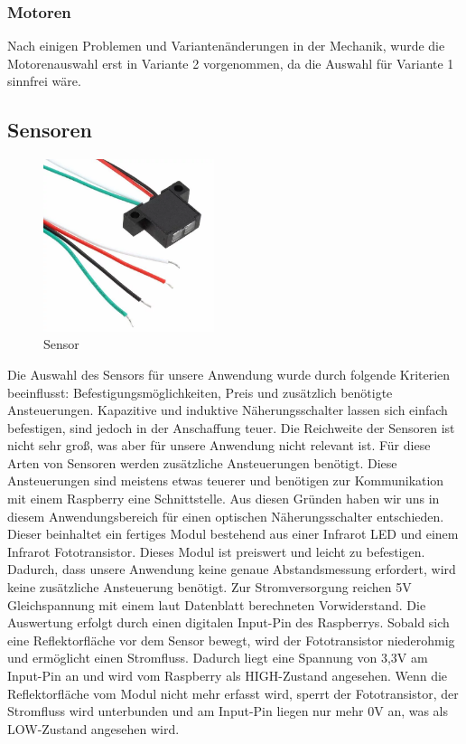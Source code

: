 \subsubsection{Motoren}
Nach einigen Problemen und Variantenänderungen in der Mechanik, wurde die Motorenauswahl erst in Variante 2 vorgenommen, da die Auswahl für Variante 1 sinnfrei wäre.

\subsection{Sensoren}
\begin{figure}[H] 
\begin{center}

\includegraphics[width=5cm]{Bilder/Bauteile/Sensor}
\caption{Sensor}
\label{Sensor}

\end{center}
\end{figure}
Die Auswahl des Sensors für unsere Anwendung wurde durch folgende Kriterien beeinflusst: Befestigungsmöglichkeiten, Preis und zusätzlich benötigte Ansteuerungen.
Kapazitive und induktive Näherungsschalter lassen sich einfach befestigen, sind jedoch in der Anschaffung teuer. Die Reichweite der Sensoren ist nicht sehr groß, was aber für unsere Anwendung nicht relevant ist. Für diese Arten von Sensoren werden zusätzliche Ansteuerungen benötigt. Diese Ansteuerungen sind meistens etwas teuerer und benötigen zur Kommunikation mit einem Raspberry eine Schnittstelle.
Aus diesen Gründen haben wir uns in diesem Anwendungsbereich für einen optischen Näherungsschalter entschieden. Dieser beinhaltet ein fertiges Modul bestehend aus einer Infrarot LED und einem Infrarot Fototransistor. Dieses Modul ist preiswert und leicht zu befestigen. Dadurch, dass unsere Anwendung keine genaue Abstandsmessung erfordert, wird keine zusätzliche Ansteuerung benötigt. Zur Stromversorgung reichen 5V Gleichspannung mit einem laut Datenblatt berechneten Vorwiderstand. Die Auswertung erfolgt durch einen digitalen Input-Pin des Raspberrys. Sobald sich eine Reflektorfläche vor dem Sensor bewegt, wird der Fototransistor niederohmig und ermöglicht einen Stromfluss. Dadurch liegt eine Spannung von 3,3V am Input-Pin an und wird vom Raspberry als HIGH-Zustand angesehen. Wenn die Reflektorfläche vom Modul nicht mehr erfasst wird, sperrt der Fototransistor, der Stromfluss wird unterbunden und am Input-Pin liegen nur mehr 0V an, was als LOW-Zustand angesehen wird. \\

